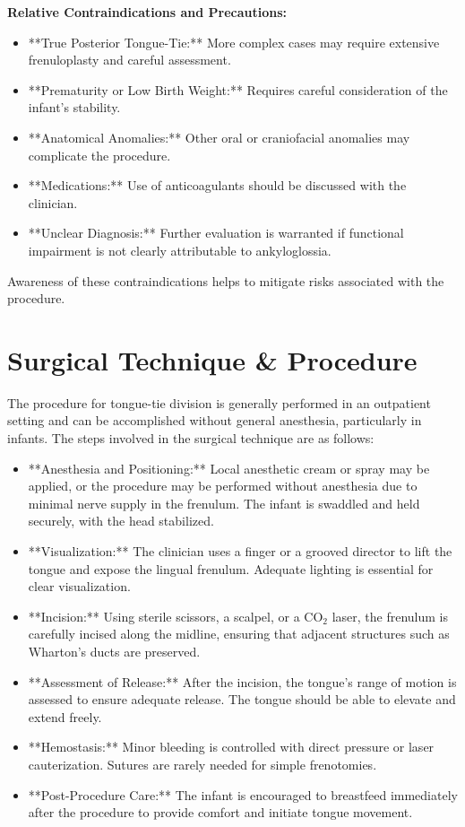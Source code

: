 \textbf{Relative Contraindications and Precautions:}
\begin{itemize}
  \item **True Posterior Tongue-Tie:** More complex cases may require extensive frenuloplasty and careful assessment.
  \item **Prematurity or Low Birth Weight:** Requires careful consideration of the infant's stability.
  \item **Anatomical Anomalies:** Other oral or craniofacial anomalies may complicate the procedure.
  \item **Medications:** Use of anticoagulants should be discussed with the clinician.
  \item **Unclear Diagnosis:** Further evaluation is warranted if functional impairment is not clearly attributable to ankyloglossia.
\end{itemize}

Awareness of these contraindications helps to mitigate risks associated with the procedure.

\section*{Surgical Technique \& Procedure}
The procedure for tongue-tie division is generally performed in an outpatient setting and can be accomplished without general anesthesia, particularly in infants. The steps involved in the surgical technique are as follows:

\begin{itemize}
  \item **Anesthesia and Positioning:** Local anesthetic cream or spray may be applied, or the procedure may be performed without anesthesia due to minimal nerve supply in the frenulum. The infant is swaddled and held securely, with the head stabilized.
  \item **Visualization:** The clinician uses a finger or a grooved director to lift the tongue and expose the lingual frenulum. Adequate lighting is essential for clear visualization.
  \item **Incision:** Using sterile scissors, a scalpel, or a CO$_{2}$ laser, the frenulum is carefully incised along the midline, ensuring that adjacent structures such as Wharton's ducts are preserved.
  \item **Assessment of Release:** After the incision, the tongue's range of motion is assessed to ensure adequate release. The tongue should be able to elevate and extend freely.
  \item **Hemostasis:** Minor bleeding is controlled with direct pressure or laser cauterization. Sutures are rarely needed for simple frenotomies.
  \item **Post-Procedure Care:** The infant is encouraged to breastfeed immediately after the procedure to provide comfort and initiate tongue movement.
\end{itemize}

